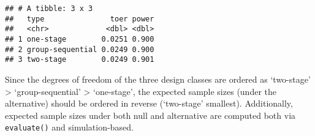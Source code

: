 \documentclass[
]{book}
\newenvironment{Shaded}{\begin{snugshade}}{\end{snugshade}}
\newcommand{\DataTypeTok}[1]{\textcolor[rgb]{0.13,0.29,0.53}{#1}}
\newcommand{\DecValTok}[1]{\textcolor[rgb]{0.00,0.00,0.81}{#1}}
\newcommand{\FloatTok}[1]{\textcolor[rgb]{0.00,0.00,0.81}{#1}}
\newcommand{\KeywordTok}[1]{\textcolor[rgb]{0.13,0.29,0.53}{\textbf{#1}}}
\newcommand{\NormalTok}[1]{#1}
\newcommand{\OperatorTok}[1]{\textcolor[rgb]{0.81,0.36,0.00}{\textbf{#1}}}
\newcommand{\StringTok}[1]{\textcolor[rgb]{0.31,0.60,0.02}{#1}}
\begin{document}
\begin{Shaded}
\end{Shaded}

\begin{verbatim}
## # A tibble: 3 x 3
##   type               toer power
##   <chr>             <dbl> <dbl>
## 1 one-stage        0.0251 0.900
## 2 group-sequential 0.0249 0.900
## 3 two-stage        0.0249 0.901
\end{verbatim}

Since the degrees of freedom of the three design classes are ordered as
`two-stage' \textgreater{} `group-sequential' \textgreater{} `one-stage',
the expected sample sizes (under the alternative) should be ordered
in reverse (`two-stage' smallest).
Additionally, expected sample sizes under both null and alternative
are computed both via \texttt{evaluate()} and simulation-based.
\end{document}
